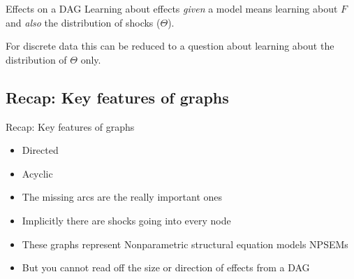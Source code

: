 \documentclass[
  11pt,
  ignorenonframetext,
]{beamer}
\providecommand{\tightlist}{%
  \setlength{\itemsep}{0pt}\setlength{\parskip}{0pt}}\usepackage{longtable,booktabs,array}
\begin{document}
\begin{frame}{Effects on a DAG}
\protect\hypertarget{effects-on-a-dag}{}
Learning about effects \emph{given} a model means learning about \(F\)
and \emph{also} the distribution of shocks (\(\Theta\)).

For discrete data this can be reduced to a question about learning about
the distribution of \(\Theta\) only.
\end{frame}

\hypertarget{recap-key-features-of-graphs}{%
\subsection{Recap: Key features of
graphs}\label{recap-key-features-of-graphs}}

\begin{frame}{Recap: Key features of graphs}
\begin{itemize}
\tightlist
\item
  Directed
\item
  Acyclic
\item
  The missing arcs are the really important ones
\item
  Implicitly there are shocks going into every node
\item
  These graphs represent Nonparametric structural equation models NPSEMs
\item
  But you cannot read off the size or direction of effects from a DAG
\end{itemize}
\end{frame}
\end{document}
